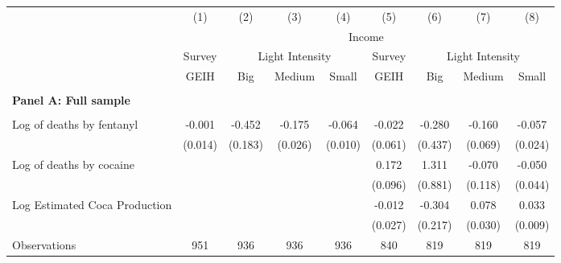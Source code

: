 \begin{tabular}{lcccccccc} \\ \hline 
                    &\multicolumn{1}{c}{(1)}         &\multicolumn{1}{c}{(2)}         &\multicolumn{1}{c}{(3)}         &\multicolumn{1}{c}{(4)}         &\multicolumn{1}{c}{(5)}         &\multicolumn{1}{c}{(6)}         &\multicolumn{1}{c}{(7)}         &\multicolumn{1}{c}{(8)}         \\
 & \multicolumn{8}{c}{Income} \\ \cline{2-5} \cline{6-9}   & Survey  &  \multicolumn{3}{c}{Light Intensity} & Survey & \multicolumn{3}{c}{Light Intensity} \\ \cline{3-5} \cline{7-9} & GEIH & Big & Medium & Small & GEIH & Big & Medium & Small \\ \hline  & & & & &  &  &  &  \\ \textbf{Panel A: Full sample} \\ & & & & & & & & \\
Log of deaths by fentanyl&      -0.001         &      -0.452\sym{**} &      -0.175\sym{***}&      -0.064\sym{***}&      -0.022         &      -0.280         &      -0.160\sym{*}  &      -0.057\sym{*}  \\
                    &     (0.014)         &     (0.183)         &     (0.026)         &     (0.010)         &     (0.061)         &     (0.437)         &     (0.069)         &     (0.024)         \\
\addlinespace
Log of deaths by cocaine&                     &                     &                     &                     &       0.172         &       1.311         &      -0.070         &      -0.050         \\
                    &                     &                     &                     &                     &     (0.096)         &     (0.881)         &     (0.118)         &     (0.044)         \\
\addlinespace
Log Estimated Coca Production&                     &                     &                     &                     &      -0.012         &      -0.304         &       0.078\sym{**} &       0.033\sym{**} \\
                    &                     &                     &                     &                     &     (0.027)         &     (0.217)         &     (0.030)         &     (0.009)         \\
\arrayrulecolor{black!10}\midrule
Observations        &         951         &         936         &         936         &         936         &         840         &         819         &         819         &         819         \\

\end{tabular}
